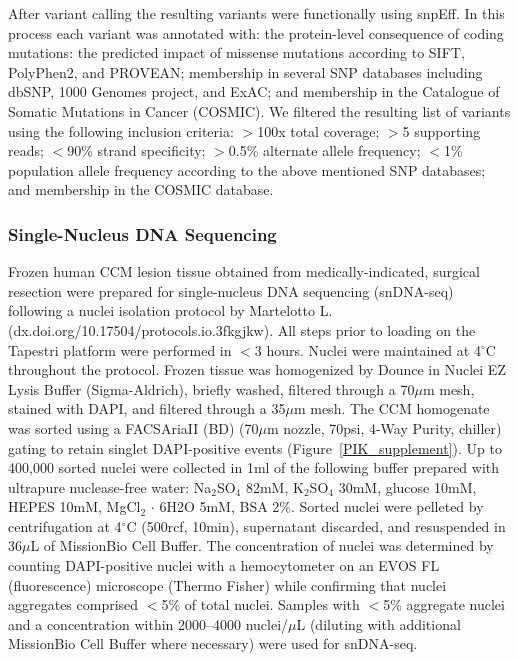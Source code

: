 After variant calling the resulting variants were functionally using snpEff. In this process each variant was annotated with: the protein-level consequence of coding mutations: the predicted impact of missense mutations according to SIFT, PolyPhen2, and PROVEAN; membership in several SNP databases including dbSNP, 1000 Genomes project, and ExAC; and membership in the Catalogue of Somatic Mutations in Cancer (COSMIC). We filtered the resulting list of variants using the following inclusion criteria: $>$100x total coverage; $>$5 supporting reads; $<$90\% strand specificity; $>$0.5\% alternate allele frequency; $<$1\% population allele frequency according to the above mentioned SNP databases; and membership in the COSMIC database. 

\subsubsection{Single-Nucleus DNA Sequencing}
Frozen human CCM lesion tissue obtained from medically-indicated, surgical resection were prepared for single-nucleus DNA sequencing (snDNA-seq) following a nuclei isolation protocol by Martelotto L. (dx.doi.org/10.17504/protocols.io.3fkgjkw). All steps prior to loading on the Tapestri platform were performed in $<$3 hours. Nuclei were maintained at 4$^{\circ}$C throughout the protocol. Frozen tissue was homogenized by Dounce in Nuclei EZ Lysis Buffer (Sigma-Aldrich), briefly washed, filtered through a 70$\mu$m mesh, stained with DAPI, and filtered through a 35$\mu$m mesh. The CCM homogenate was sorted using a FACSAriaII (BD) (70$\mu$m nozzle, 70psi, 4-Way Purity, chiller) gating to retain singlet DAPI-positive events (Figure~\ref{PIK_supplement}). Up to 400,000 sorted nuclei were collected in 1ml of the following buffer prepared with ultrapure nuclease-free water: Na$_2$SO$_4$ 82mM, K$_2$SO$_4$ 30mM, glucose 10mM, HEPES 10mM, MgCl$_2$ $\cdot$ 6H2O 5mM, BSA 2\%. Sorted nuclei were pelleted by centrifugation at 4$^{\circ}$C (500rcf, 10min), supernatant discarded, and resuspended in 36$\mu$L of MissionBio Cell Buffer. The concentration of nuclei was determined by counting DAPI-positive nuclei with a hemocytometer on an EVOS FL (fluorescence) microscope (Thermo Fisher) while confirming that nuclei aggregates comprised $<$5\% of total nuclei. Samples with $<$5\% aggregate nuclei and a concentration within 2000--4000 nuclei/$\mu$L (diluting with additional MissionBio Cell Buffer where necessary) were used for snDNA-seq.

